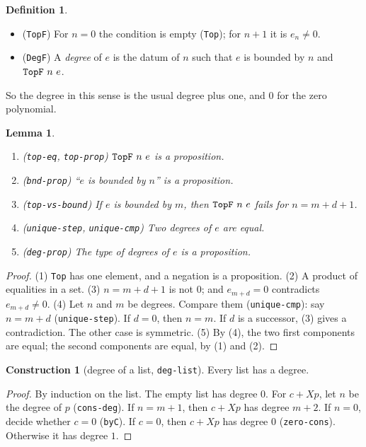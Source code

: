 \documentclass[11pt]{amsart}
\newtheorem{lemma}[theorem]{Lemma}
\theoremstyle{definition}
\newtheorem{definition}[theorem]{Definition}
\newtheorem{construction}[theorem]{Construction}
\theoremstyle{remark}
\newcommand{\nm}[1]{\textup{\texttt{#1}}}
\begin{document}
\begin{definition}
\begin{itemize}
\item (\nm{TopF}) For $n=0$ the condition is empty (\nm{Top}); for $n+1$
  it is $e_n\neq0$.
\item (\nm{DegF}) A \emph{degree} of $e$ is the datum of $n$ such that
  $e$ is bounded by $n$ and $\nm{TopF}\ n\ e$.
\end{itemize}
\end{definition}

\noindent So the degree in this sense is the usual degree plus one, and
$0$ for the zero polynomial.

\begin{lemma}\label{lem:degprop}
\begin{enumerate}
\item (\nm{top-eq}, \nm{top-prop}) $\nm{TopF}\ n\ e$ is a proposition.
\item (\nm{bnd-prop}) ``$e$ is bounded by $n$'' is a proposition.
\item (\nm{top-vs-bound}) If $e$ is bounded by $m$, then
  $\nm{TopF}\ n\ e$ fails for $n = m+d+1$.
\item (\nm{unique-step}, \nm{unique-cmp}) Two degrees of $e$ are equal.
\item (\nm{deg-prop}) The type of degrees of $e$ is a proposition.
\end{enumerate}
\end{lemma}
\begin{proof}
(1) \nm{Top} has one element, and a negation is a proposition.
(2) A product of equalities in a set.
(3) $n = m+d+1$ is not $0$; and $e_{m+d}=0$ contradicts $e_{m+d}\neq0$.
(4) Let $n$ and $m$ be degrees. Compare them (\nm{unique-cmp}): say
$n = m + d$ (\nm{unique-step}). If $d=0$, then $n=m$. If $d$ is a
successor, (3) gives a contradiction. The other case is symmetric.
(5) By (4), the two first components are equal; the second components are
equal, by (1) and (2).
\end{proof}

\begin{construction}[degree of a list, \nm{deg-list}]
Every list has a degree.
\end{construction}
\begin{proof}
By induction on the list. The empty list has degree $0$. For $c+Xp$, let
$n$ be the degree of $p$ (\nm{cons-deg}). If $n = m+1$, then $c+Xp$ has
degree $m+2$. If $n = 0$, decide whether $c=0$ (\nm{byC}). If $c=0$, then
$c+Xp$ has degree $0$ (\nm{zero-cons}). Otherwise it has degree $1$.
\end{proof}
\end{document}
